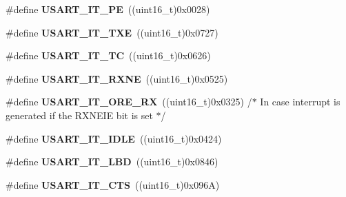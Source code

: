 \begin{DoxyCompactItemize}
\item 
\mbox{\label{group___u_s_a_r_t___interrupt__definition_gae607c28a462c224c575b7541dc4f7067}} 
\#define {\bfseries U\+S\+A\+R\+T\+\_\+\+I\+T\+\_\+\+PE}~((uint16\+\_\+t)0x0028)
\item 
\mbox{\label{group___u_s_a_r_t___interrupt__definition_gab18d0fe889204a4c34f6d5817fb5147d}} 
\#define {\bfseries U\+S\+A\+R\+T\+\_\+\+I\+T\+\_\+\+T\+XE}~((uint16\+\_\+t)0x0727)
\item 
\mbox{\label{group___u_s_a_r_t___interrupt__definition_ga748e86162cc110513330079982821c39}} 
\#define {\bfseries U\+S\+A\+R\+T\+\_\+\+I\+T\+\_\+\+TC}~((uint16\+\_\+t)0x0626)
\item 
\mbox{\label{group___u_s_a_r_t___interrupt__definition_gacdd49b93072655a21a63a35e6431f8ae}} 
\#define {\bfseries U\+S\+A\+R\+T\+\_\+\+I\+T\+\_\+\+R\+X\+NE}~((uint16\+\_\+t)0x0525)
\item 
\mbox{\label{group___u_s_a_r_t___interrupt__definition_gaad8fd44c80b30285dc3088a0b3aa5bd9}} 
\#define {\bfseries U\+S\+A\+R\+T\+\_\+\+I\+T\+\_\+\+O\+R\+E\+\_\+\+RX}~((uint16\+\_\+t)0x0325) /$\ast$ In case interrupt is generated if the R\+X\+N\+E\+I\+E bit is set $\ast$/
\item 
\mbox{\label{group___u_s_a_r_t___interrupt__definition_ga5d85aab24b7b2dfddb61ba2a49fa6185}} 
\#define {\bfseries U\+S\+A\+R\+T\+\_\+\+I\+T\+\_\+\+I\+D\+LE}~((uint16\+\_\+t)0x0424)
\item 
\mbox{\label{group___u_s_a_r_t___interrupt__definition_ga063628e16cdda199b07d380421afc4a5}} 
\#define {\bfseries U\+S\+A\+R\+T\+\_\+\+I\+T\+\_\+\+L\+BD}~((uint16\+\_\+t)0x0846)
\item 
\mbox{\label{group___u_s_a_r_t___interrupt__definition_gab49efbefaca2921e8cbe8f5146e99dbd}} 
\#define {\bfseries U\+S\+A\+R\+T\+\_\+\+I\+T\+\_\+\+C\+TS}~((uint16\+\_\+t)0x096\+A)

\end{DoxyCompactItemize}
